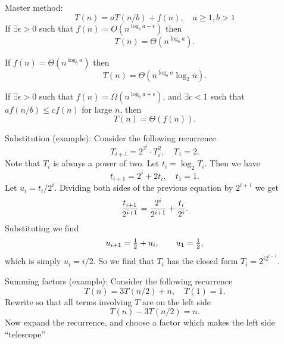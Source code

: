 Master method:
$$T(n) = aT(n/b) + f(n), \quad a\geq 1, b > 1$$
If $\exists \epsilon > 0$ such that $f(n) = O(n^{\log_b a - \epsilon})$ then
$$T(n) = \Theta(n^{\log_b a}).$$
\par
If $f(n) = \Theta(n^{\log_b a})$ then
$$T(n) = \Theta(n^{\log_b a} \log_2 n).$$
\par
If $\exists \epsilon > 0$ such that $f(n) = \Omega(n^{\log_b a + \epsilon})$,
and $\exists c < 1$ such that $a f(n/b) \leq cf(n)$ for large $n$,
then
$$T(n) = \Theta(f(n)).$$
\par
Substitution (example): Consider the following recurrence
$$T_{i+1} = 2^{2^i} \cdot T_i^2, \quad T_1 = 2.$$
Note that $T_i$ is always a power of two.
Let $t_i = \log_2 T_i$.
Then we have
$$
t_{i+1} = 2^i + 2 t_i, \quad t_1 = 1.
$$
Let $u_i = t_i/2^i$.
Dividing both sides of the previous equation by $2^{i+1}$ we get
$$
{t_{i+1} \over 2^{i+1}} = {2^i \over 2^{i+1}} + {t_i \over 2^i}.
$$
Substituting we find
$$
u_{i+1} = \sfrac 1 2 + u_i, \qquad u_1 = \sfrac 1 2 ,
$$
which is simply $u_i = i/2$.
So we find that $T_i$ has the closed form $T_i = 2^{i2^{i-1}}$.
\par
Summing factors (example): Consider the following recurrence
$$T(n) = 3T(n/2) + n, \quad T(1) = 1.$$
Rewrite so that all terms involving $T$ are on the
left side
$$T(n) - 3T(n/2) = n.$$
Now expand the recurrence,
and choose a factor which makes the left side ``telescope''

